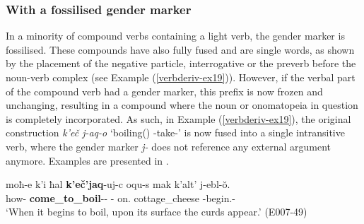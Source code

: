 \subsubsection{With a fossilised gender marker} \label{lightverbfoss}

In a minority of compound verbs containing a light verb, the gender marker is fossilised. These compounds have also fully fused and are single words, as shown by the placement of the negative particle, interrogative or the preverb before the noun-verb complex (see Example (\ref{verbderiv-ex19})). However, if the verbal part of the compound verb had a gender marker, this prefix is now frozen and unchanging, resulting in a compound where the noun or onomatopeia in question is completely incorporated. As such, in Example (\ref{verbderiv-ex19}), the original construction \textit{k'eč j-aq-o} `boiling({\J}) {\J}-take-{\Npst}' is now fused into a single intransitive verb, where the gender marker \textit{j-} does not reference any external argument anymore.  Examples are presented in . 



	\begin{exe}
		\ex\label{verbderiv-ex19}
		\gll moħ-e k'i ħal \textbf{k'eč'jaq}-uj-c oqu-s mak k'alt' j-ebl-\u{o}.  \\
		how-{\Rel} {\Contr} {\Pv} \textbf{come\_to\_boil}-{\Npst}-{\Subord} {\Dist}-{\Erg} on.{\Pv} cottage\_cheese {\J}-begin.{\Ipfv}-{\Npst} \\
		\trans `When it begins to boil, upon its surface the curds appear.'
		\hfill (E007-49)
	\end{exe}




